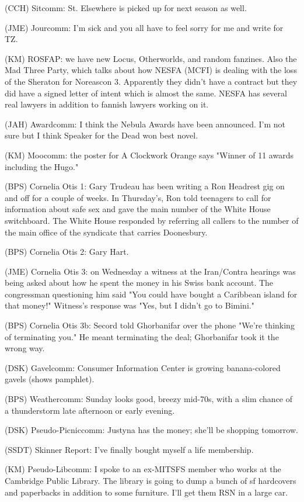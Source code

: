 \documentclass[12pt]{article}
\begin{document}
(CCH) Sitcomm: St. Elsewhere is picked up for next season as well.

(JME) Jourcomm: I'm sick and you all have to feel sorry for me and write for TZ.

(KM) ROSFAP: we have new Locus, Otherworlds, and random fanzines. Also the Mad Three Party, which talks about how NESFA (MCFI) is dealing with the loss of the Sheraton for Noreascon 3. Apparently they didn't have a contract but they did have a signed letter of intent which is almost the same. NESFA has several real lawyers in addition to fannish lawyers working on it.

(JAH) Awardcomm: I think the Nebula Awards have been announced. I'm not sure but I think Speaker for the Dead won best novel.

(KM) Moocomm: the poster for A Clockwork Orange says "Winner of 11 awards including the Hugo."

(BPS) Cornelia Otis 1: Gary Trudeau has been writing a Ron Headrest gig on and off for a couple of weeks. In Thursday's, Ron told teenagers to call for information about safe sex and gave the main number of the White House switchboard. The White House responded by referring all callers to the number of the main office of the syndicate that carries Doonesbury.

(BPS) Cornelia Otis 2: Gary Hart.

(JME) Cornelia Otis 3: on Wednesday a witness at the Iran/Contra hearings was being asked about how he spent the money in his Swiss bank account. The congressman questioning him said "You could have bought a Caribbean island for that money!" Witness's response was "Yes, but I didn't go to Bimini."

(BPS) Cornelia Otis 3b: Secord told Ghorbanifar over the phone "We're thinking of terminating you." He meant terminating the deal; Ghorbanifar took it the wrong way.

(DSK) Gavelcomm: Consumer Information Center is growing banana-colored gavels (shows pamphlet).

(BPS) Weathercomm: Sunday looks good, breezy mid-70s, with a slim chance of a thunderstorm late afternoon or early evening.

(DSK) Pseudo-Picniccomm: Justyna has the money; she'll be shopping tomorrow.

(SSDT) Skinner Report: I've finally bought myself a life membership.

(KM) Pseudo-Libcomm: I spoke to an ex-MITSFS member who works at the Cambridge Public Library. The library is going to dump a bunch of sf hardcovers and paperbacks in addition to some furniture. I'll get them RSN in a large car.
\end{document}
